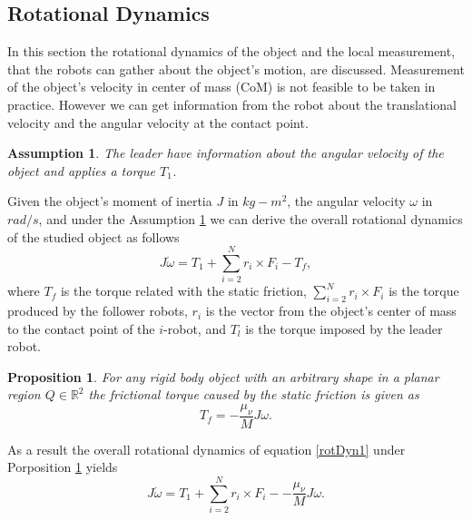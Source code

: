 \documentclass[letterpaper, 10 pt, conference]{ieeeconf}
\newtheorem{assumption}{\textbf{Assumption}}
\newtheorem{proposition}{\textbf{Proposition}}
\begin{document}
\subsection{Rotational Dynamics}\label{rd}
In this section the rotational dynamics of the object and the local measurement, that the robots can gather about the object's motion, are discussed. Measurement of the object's velocity in center of mass (CoM) is not feasible to be taken in practice. However we can get information from the robot about the translational velocity and the angular velocity at the contact point. \vspace{.2cm}
\begin{assumption}\label{as2}
\textit{The leader have information about the angular velocity of the object and applies a torque $T_1$.} \vspace{.2cm}
\end{assumption}
Given the object's moment of inertia $J$ in $kg-m^2$, the angular velocity $\omega$ in $rad/s$, and under the Assumption \ref{as2} we can derive the overall rotational dynamics of the studied object as follows
\begin{equation}\label{rotDyn1}
J\dot{\omega}=T_1 +\sum_{i=2}^{N}r_i\times F_i-T_f,
\end{equation}
where $T_f$ is the torque related with the static friction, $\sum_{i=2}^{N}r_i\times F_i$ is the torque produced by the follower robots, $r_i$ is the vector from the object's center of mass to the contact point of the $i$-robot,  and $T_l$ is the torque imposed by the leader robot.\vspace{.2cm}
\begin{proposition}\label{pr1}
\textit{For any rigid body object with an arbitrary shape in a planar region $Q \in \mathbb{R}^2$ the frictional torque caused by the static friction is given as}
\begin{equation}
T_f=-\frac{\mu_{\nu}}{M}J\omega.
\end{equation} \vspace{.2cm}
\end{proposition}
As a result the overall rotational dynamics of equation \ref{rotDyn1} under Porposition \ref{pr1} yields
\begin{equation}
J\dot{\omega}=T_1 +\sum_{i=2}^{N}r_i\times F_i--\frac{\mu_{\nu}}{M}J\omega.
\end{equation}\label{rotDyn2}
\end{document}
